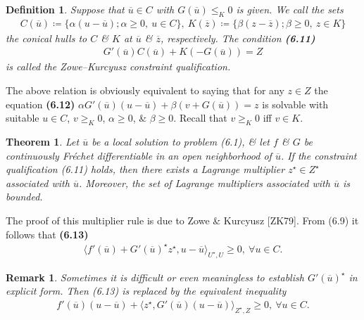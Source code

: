\documentclass[oneside]{book}
\numberwithin{equation}{section}
\newtheorem{definition}{Definition}[chapter]
\newtheorem{remark}{Remark}[chapter]
\newtheorem{theorem}{Theorem}[chapter]
\begin{document}
\begin{definition}
	Suppose that $\overline{u}\in C$ with $G(\overline{u})\le_K 0$ is given. We call the sets
	\begin{align*}
		C(\overline{u})\coloneqq\{\alpha(u - \overline{u});\alpha\ge 0,\ u\in C\},\ K(\overline{z})\coloneqq\{\beta(z - \overline{z});\beta\ge 0,\ z\in K\}
	\end{align*}
	the \emph{conical hulls} to $C$ \& $K$ at $\overline{u}$ \& $\overline{z}$, respectively. The condition \textbf{(6.11)}
	\begin{align*}
		G'(\overline{u})C(\overline{u}) + K(-G(\overline{u})) = Z
	\end{align*}
	is called the \emph{Zowe--Kurcyusz constraint qualification}.
\end{definition}
The above relation is obviously equivalent to saying that for any $z\in Z$ the equation \textbf{(6.12)} $\alpha G'(\overline{u})(u - \overline{u}) + \beta(v + G(\overline{u})) = z$ is solvable with suitable $u\in C$, $v\ge_K 0$, $\alpha\ge 0$, \& $\beta\ge 0$. Recall that $v\ge_K 0$ iff $v\in K$.

\begin{theorem}
	Let $\overline{u}$ be a local solution to problem (6.1), \& let $f$ \& $G$ be continuously Fr\'echet differentiable in an open neighborhood of $\overline{u}$. If the constraint qualification (6.11) holds, then there exists a Lagrange multiplier $z^\star\in Z^\star$ associated with $\overline{u}$. Moreover, the set of Lagrange multipliers associated with $\overline{u}$ is bounded.
\end{theorem}
The proof of this multiplier rule is due to Zowe \& Kurcyusz [ZK79]. From (6.9) it follows that \textbf{(6.13)}
\begin{align*}
	\langle f'(\overline{u}) + G'(\overline{u})^\star z^\star,u - \overline{u}\rangle_{U^\star,U}\ge 0,\ \forall u\in C.
\end{align*}

\begin{remark}
	Sometimes it is difficult or even meaningless to establish $G'(\overline{u})^\star$ in explicit form. Then (6.13) is replaced by the equivalent inequality
	\begin{align*}
		f'(\overline{u})(u - \overline{u}) + \langle z^\star,G'(\overline{u})(u - \overline{u})\rangle_{Z^\star,Z}\ge 0,\ \forall u\in C.
	\end{align*}
\end{remark}
\end{document}
